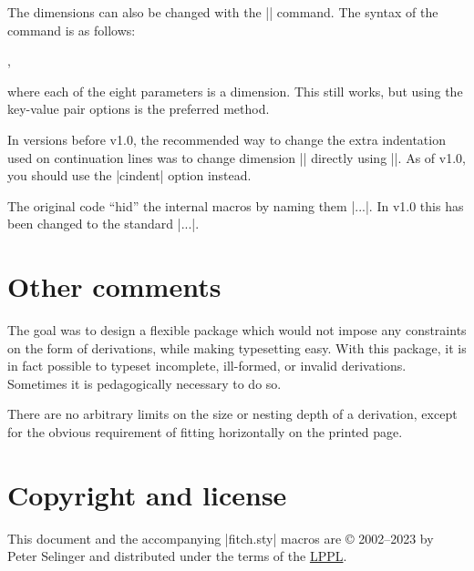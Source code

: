 \documentclass{ltxdoc}
\newcommand\NewIn[1]{\leavevmode
  \marginpar{\hfill\fbox{\fbox{New in #1}}\hspace*{1em}}\ignorespaces}
\begin{document}
\DescribeMacro{\nddim}
The dimensions can also be changed with the
|\nddim| command. The syntax of the command is as follows:
\begin{center}
  \cmd{\nddim}
  ,
\end{center}
where each of the eight parameters is a dimension. This still works,
but using the key-value pair options is the preferred method.

\NewIn{1.0}\DescribeMacro{\ndindent} In versions before v1.0, the recommended way
to change the extra indentation used on continuation lines was to
change dimension |\ndindent| directly using |\setlength|. As of v1.0,
you should use the |cindent| option instead.

The original code ``hid'' the internal macros by naming
them |\nd*...|. In v1.0 this has been changed to the standard
|\nd@...|.

\section{Other comments}

The goal was to design a flexible package which would not impose any
constraints on the form of derivations, while making typesetting easy.
With this package, it is in fact possible to typeset incomplete,
ill-formed, or invalid derivations. Sometimes it is pedagogically necessary
to do so.

There are no arbitrary limits on the size or nesting depth of a derivation,
except for the obvious requirement of fitting horizontally on the
printed page.

\section{Copyright and license}

This document and the accompanying |fitch.sty| macros
are {\copyright} 2002--2023 by Peter Selinger and distributed under
the terms of the \href{https://www.latex-project.org/lppl/}{LPPL}.
\end{document}

